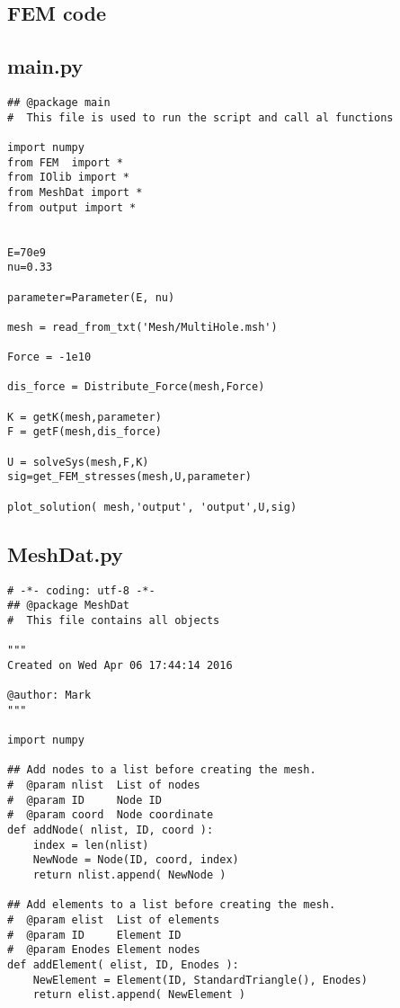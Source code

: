 
\begin{appendices}

\chapter{FEM code}
\label{AppA}
\section{main.py}


\begin{verbatim}
## @package main
#  This file is used to run the script and call al functions

import numpy
from FEM  import *
from IOlib import *
from MeshDat import *
from output import *


E=70e9
nu=0.33

parameter=Parameter(E, nu)

mesh = read_from_txt('Mesh/MultiHole.msh')

Force = -1e10

dis_force = Distribute_Force(mesh,Force)

K = getK(mesh,parameter)
F = getF(mesh,dis_force)

U = solveSys(mesh,F,K)
sig=get_FEM_stresses(mesh,U,parameter)

plot_solution( mesh,'output', 'output',U,sig)

\end{verbatim}


\section{MeshDat.py}
\begin{verbatim}
# -*- coding: utf-8 -*-
## @package MeshDat
#  This file contains all objects

"""
Created on Wed Apr 06 17:44:14 2016

@author: Mark
"""

import numpy 

## Add nodes to a list before creating the mesh.
#  @param nlist  List of nodes
#  @param ID     Node ID
#  @param coord  Node coordinate
def addNode( nlist, ID, coord ):
    index = len(nlist)
    NewNode = Node(ID, coord, index)
    return nlist.append( NewNode )

## Add elements to a list before creating the mesh.
#  @param elist  List of elements
#  @param ID     Element ID
#  @param Enodes Element nodes
def addElement( elist, ID, Enodes ):
    NewElement = Element(ID, StandardTriangle(), Enodes)
    return elist.append( NewElement )


\end{verbatim}
\end{appendices}
